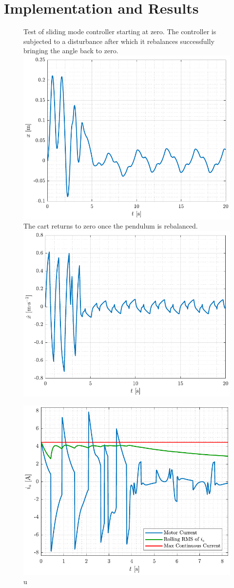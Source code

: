\chapter{Implementation and Results}

%
%
%
%
%


\begin{figure}[H]
  \hspace{-10pt}
  \captionbox
  {
    Test of sliding mode controller starting at zero. The controller is subjected to a disturbance after which it rebalances successfully bringing the angle back to zero.
    \label{fig:slidingMode_test_theta}
  }
  {
    \hspace{-1cm}
    \includegraphics[width=.4\textwidth]{figures/x_4_conX}
  }
  \hspace{20pt}
  \captionbox 
  {
    The cart returns to zero once the pendulum is rebalanced.
    \label{fig:slidingMode_test_x}
  }
  {
    \hspace{-1cm}
    \includegraphics[width=.4\textwidth]{figures/xDot_4_conX}
  }  
\end{figure}

\begin{figure}[H]
  \includegraphics[width=.42\textwidth]{figures/ia_4_conX}
  \caption{ u  }
  \label{fig:slidingMode_test_u}
\end{figure}

